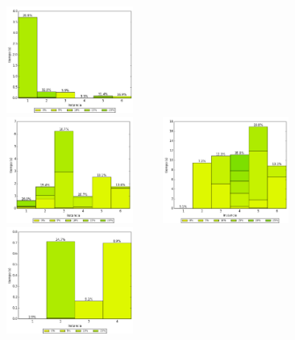 \begin{columns}[t]
\centering
\includegraphics[width=5cm,height=3.5cm]{./evaluacion_experimental/mejoras_greedy_clei/greedy_costo_Chicas}\\
\includegraphics[width=5cm,height=3.5cm]{./evaluacion_experimental/mejoras_greedy_clei/greedy_costo_Medianas}
\centering
\includegraphics[width=5cm,height=3.5cm]{./evaluacion_experimental/mejoras_greedy_clei/greedy_costo_Grandes}\\
\includegraphics[width=5cm,height=3.5cm]{./evaluacion_experimental/mejoras_greedy_clei/greedy_costo_Montevideo}
\end{columns}
